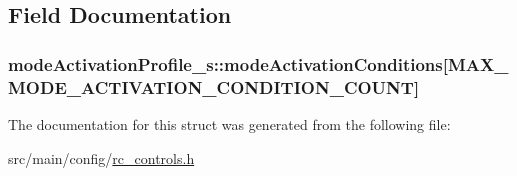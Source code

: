 \subsection{Field Documentation}
\hypertarget{structmodeActivationProfile__s_adc750df729f5f32c8f9e4917d245fc96}{
\subsubsection[{mode\+Activation\+Conditions}]{ mode\+Activation\+Profile\+\_\+s\+::mode\+Activation\+Conditions\mbox{[}{\bf M\+A\+X\+\_\+\+M\+O\+D\+E\+\_\+\+A\+C\+T\+I\+V\+A\+T\+I\+O\+N\+\_\+\+C\+O\+N\+D\+I\+T\+I\+O\+N\+\_\+\+C\+O\+U\+N\+T}\mbox{]}}}\label{structmodeActivationProfile__s_adc750df729f5f32c8f9e4917d245fc96}


The documentation for this struct was generated from the following file\+:\begin{DoxyCompactItemize}
\item 
src/main/config/\hyperlink{rc__controls_8h}{rc\+\_\+controls.\+h}\end{DoxyCompactItemize}
